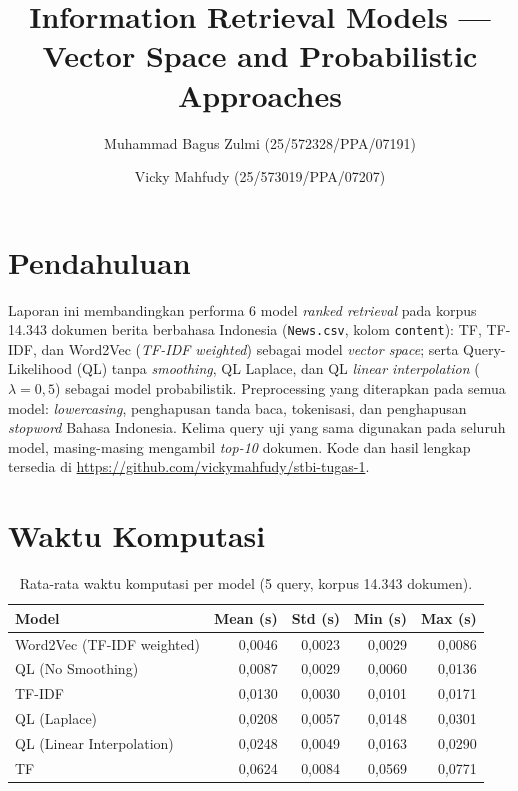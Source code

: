 \documentclass[10pt,a4paper]{article}
\title{\textbf{\large Information Retrieval Models — Vector Space and Probabilistic Approaches}}
\author{Muhammad Bagus Zulmi (25/572328/PPA/07191) \and Vicky Mahfudy (25/573019/PPA/07207)\\[0.3em]}
\date{}
\begin{document}
\maketitle

\vspace{-1.5em}

\section{Pendahuluan}

Laporan ini membandingkan performa 6 model \emph{ranked retrieval} pada korpus 14.343 dokumen berita berbahasa Indonesia (\texttt{News.csv}, kolom \texttt{content}): TF, TF-IDF, dan Word2Vec (\emph{TF-IDF weighted}) sebagai model \emph{vector space}; serta Query-Likelihood (QL) tanpa \emph{smoothing}, QL Laplace, dan QL \emph{linear interpolation} ($\lambda=0{,}5$) sebagai model probabilistik. Preprocessing yang diterapkan pada semua model: \emph{lowercasing}, penghapusan tanda baca, tokenisasi, dan penghapusan \emph{stopword} Bahasa Indonesia. Kelima query uji yang sama digunakan pada seluruh model, masing-masing mengambil \emph{top-10} dokumen. Kode dan hasil lengkap tersedia di \url{https://github.com/vickymahfudy/stbi-tugas-1}.

\section{Waktu Komputasi}

\begin{table}[h]
    \centering
    \small
    \begin{tabular}{lrrrr}
        \toprule
        \textbf{Model} & \textbf{Mean (s)} & \textbf{Std (s)} & \textbf{Min (s)} & \textbf{Max (s)} \\
        \midrule
        Word2Vec (TF-IDF weighted) & 0,0046 & 0,0023 & 0,0029 & 0,0086 \\
        QL (No Smoothing)          & 0,0087 & 0,0029 & 0,0060 & 0,0136 \\
        TF-IDF                     & 0,0130 & 0,0030 & 0,0101 & 0,0171 \\
        QL (Laplace)               & 0,0208 & 0,0057 & 0,0148 & 0,0301 \\
        QL (Linear Interpolation)  & 0,0248 & 0,0049 & 0,0163 & 0,0290 \\
        TF                         & 0,0624 & 0,0084 & 0,0569 & 0,0771 \\
        \bottomrule
    \end{tabular}
    \caption{Rata-rata waktu komputasi per model (5 query, korpus 14.343 dokumen).}
\end{table}
\end{document}
